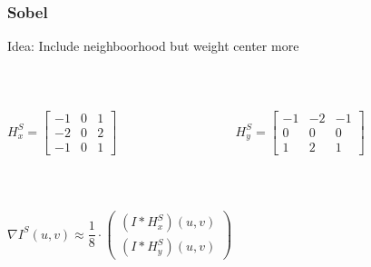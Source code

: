 \begin{frame}
	\frametitle{Sobel}
	\begin{center}
		Idea: Include neighboorhood but weight center more
	\end{center}
	~\newline	
	\begin{columns}
		\begin{column}{0.5\textwidth}
			\begin{center}
				$H^S_x = \begin{bmatrix}
				-1 & 0 & 1 \\ -2 & 0 & 2 \\ -1 & 0 & 1
				\end{bmatrix} $
			\end{center}	
		\end{column}
		\begin{column}{0.5\textwidth} 
			\begin{center}
				$H^S_y = \begin{bmatrix}
				-1 & -2 & -1 \\ 0 & 0 & 0 \\ 1 & 2 & 1
				\end{bmatrix} $
			\end{center}
		\end{column}
	\end{columns}
	~\newline
	\begin{center}
		$\nabla I^S(u,v)\approx \dfrac{1}{8} \cdot \begin{pmatrix}
		(I\ast H^S_x)(u,v) \\ (I\ast H^S_y)(u,v) 
		\end{pmatrix}$
	\end{center}
\end{frame}

